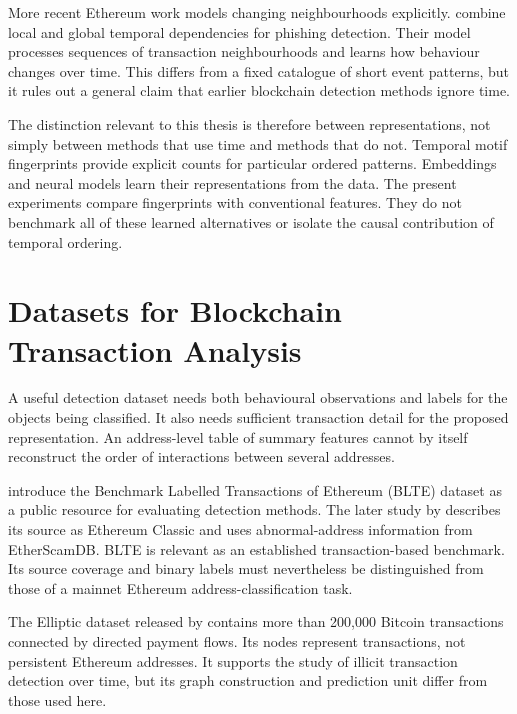 More recent Ethereum work models changing neighbourhoods explicitly.
\citet{ghoshcatalog2025} combine local and global temporal dependencies for
phishing detection. Their model processes sequences of transaction
neighbourhoods and learns how behaviour changes over time. This differs from a
fixed catalogue of short event patterns, but it rules out a general claim that
earlier blockchain detection methods ignore time.

The distinction relevant to this thesis is therefore between representations,
not simply between methods that use time and methods that do not. Temporal
motif fingerprints provide explicit counts for particular ordered patterns.
Embeddings and neural models learn their representations from the data. The
present experiments compare fingerprints with conventional features. They do
not benchmark all of these learned alternatives or isolate the causal
contribution of temporal ordering.

\section{Datasets for Blockchain Transaction Analysis}
\label{sec:relwork_datasets}

A useful detection dataset needs both behavioural observations and labels for
the objects being classified. It also needs sufficient transaction detail for
the proposed representation. An address-level table of summary features cannot
by itself reconstruct the order of interactions between several addresses.

\citet{alemari2021labeled} introduce the Benchmark Labelled Transactions of
Ethereum (BLTE) dataset as a public resource for evaluating detection methods.
The later study by \citet{sanjalawe2023atd} describes its source as Ethereum
Classic and uses abnormal-address information from EtherScamDB. BLTE is relevant
as an established transaction-based benchmark. Its source coverage and binary
labels must nevertheless be distinguished from those of a mainnet Ethereum
address-classification task.

The Elliptic dataset released by \citet{weber2019bitcoin} contains more than
200,000 Bitcoin transactions connected by directed payment flows. Its nodes
represent transactions, not persistent Ethereum addresses. It supports the
study of illicit transaction detection over time, but its graph construction
and prediction unit differ from those used here.

